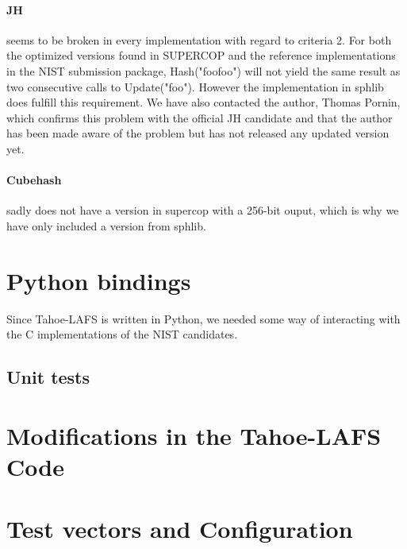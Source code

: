 \documentclass[english,12pt,a4paper]{book}
\begin{document}
\paragraph{JH} seems to be broken in every implementation with regard to
criteria 2. For both the optimized versions found in \ac{SUPERCOP} and the
reference implementations in the \ac{NIST} submission package, Hash("foofoo")
will not yield the same result as two consecutive calls to Update("foo").
However the implementation in sphlib does fulfill this requirement. We have
also contacted the author, Thomas Pornin, which confirms this problem with the
official JH candidate and that the author has been made aware of the problem
but has not released any updated version yet.

\paragraph{Cubehash} sadly does not have a version in supercop with a 256-bit
ouput, which is why we have only included a version from sphlib.






\section{Python bindings}

Since Tahoe-\ac{LAFS} is written in Python, we needed some way of interacting
with the C implementations of the NIST candidates.

\subsection{Unit tests}

\section{Modifications in the Tahoe-LAFS Code}


\section{Test vectors and Configuration}
\end{document}
